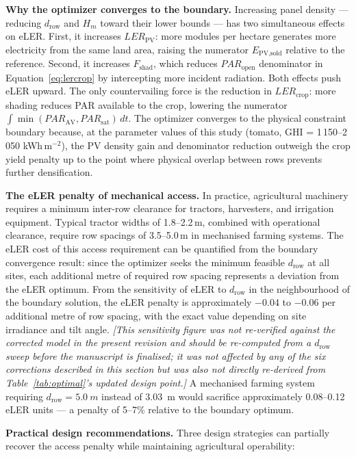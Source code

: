 \textbf{Why the optimizer converges to the boundary.}
Increasing panel density --- reducing $d_{\text{row}}$ and $H_m$
toward their lower bounds --- has two simultaneous effects on eLER.
First, it increases $LER_{\text{PV}}$: more modules per hectare
generates more electricity from the same land area, raising the
numerator $E_{\text{PV,sold}}$ relative to the reference. Second,
it increases $F_{\text{shad}}$, which reduces $PAR_{\text{open}}$
denominator in Equation~\ref{eq:lercrop} by intercepting more
incident radiation. Both effects push eLER upward. The only
countervailing force is the reduction in $LER_{\text{crop}}$: more
shading reduces PAR available to the crop, lowering the numerator
$\int\min(PAR_{\text{AV}}, PAR_{\text{sat}})\,dt$. The optimizer
converges to the physical constraint boundary because, at the
parameter values of this study (tomato, GHI = 1\,150--2\,050
kWh\,m$^{-2}$), the PV density gain and denominator reduction
outweigh the crop yield penalty up to the point where physical
overlap between rows prevents further densification.

\textbf{The eLER penalty of mechanical access.}
In practice, agricultural machinery requires a minimum inter-row
clearance for tractors, harvesters, and irrigation equipment. Typical
tractor widths of 1.8--2.2\,m, combined with operational clearance,
require row spacings of 3.5--5.0\,m in mechanised farming systems.
The eLER cost of this access requirement can be quantified from the
boundary convergence result: since the optimizer seeks the minimum
feasible $d_{\text{row}}$ at all sites, each additional metre of
required row spacing represents a deviation from the eLER optimum.
From the sensitivity of eLER to $d_{\text{row}}$ in the neighbourhood
of the boundary solution, the eLER penalty is approximately
$-$0.04 to $-$0.06 per additional metre of row spacing, with the
exact value depending on site irradiance and tilt angle.
\textit{[This sensitivity figure was not re-verified against the
corrected model in the present revision and should be re-computed
from a $d_{\text{row}}$ sweep before the manuscript is finalised;
it was not affected by any of the six corrections described in
this section but was also not directly re-derived from
Table~\ref{tab:optimal}'s updated design point.]}
A mechanised
farming system requiring $d_{\text{row}} = \SI{5.0}{m}$ instead of
\SI{3.03}{m} would sacrifice approximately 0.08--0.12\,eLER units
--- a penalty of 5--7\% relative to the boundary optimum.

\textbf{Practical design recommendations.}
Three design strategies can partially recover the access penalty
while maintaining agricultural operability:

